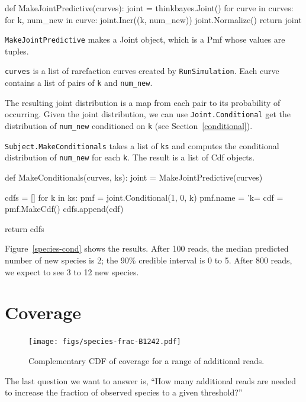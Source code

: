 \documentclass[12pt]{book}
\theoremstyle{exercise}
\newcommand{\py}[1]{{\tt #1}}%
\begin{document}
\begin{code}
def MakeJointPredictive(curves):
    joint = thinkbayes.Joint()
    for curve in curves:
        for k, num_new in curve:
            joint.Incr((k, num_new))
    joint.Normalize()
    return joint
\end{code}

\py{MakeJointPredictive} makes a Joint object, which is a
Pmf whose values are tuples.

\py{curves} is a list of rarefaction curves created by
\py{RunSimulation}.  Each curve contains a list of pairs of
\py{k} and \verb"num_new".

The resulting joint distribution is a map from each pair to
its probability of occurring.  Given the joint distribution, we
can use \py{Joint.Conditional}
get the distribution of \verb"num_new" conditioned on \py{k}
(see Section~\ref{conditional}).

\py{Subject.MakeConditionals} takes a list of \py{ks}
and computes the conditional distribution of \verb"num_new"
for each \py{k}.  The result is a list of Cdf objects.

\begin{code}
def MakeConditionals(curves, ks):
    joint = MakeJointPredictive(curves)

    cdfs = []
    for k in ks:
        pmf = joint.Conditional(1, 0, k)
        pmf.name = 'k=%
        cdf = pmf.MakeCdf()
        cdfs.append(cdf)

    return cdfs
\end{code}

Figure~\ref{species-cond} shows the results.  After 100 reads, the
median predicted number of new species is 2; the 90\% credible
interval is 0 to 5.  After 800 reads, we expect to see 3 to 12 new
species.


\section{Coverage}

\begin{figure}
\centerline{\texttt{[image: figs/species-frac-B1242.pdf]}}
\caption{Complementary CDF of coverage for a range of additional reads.}
\label{species-frac}
\end{figure}

The last question we want to answer is, ``How many additional reads
are needed to increase the fraction of observed species to a given
threshold?''
\end{document}
